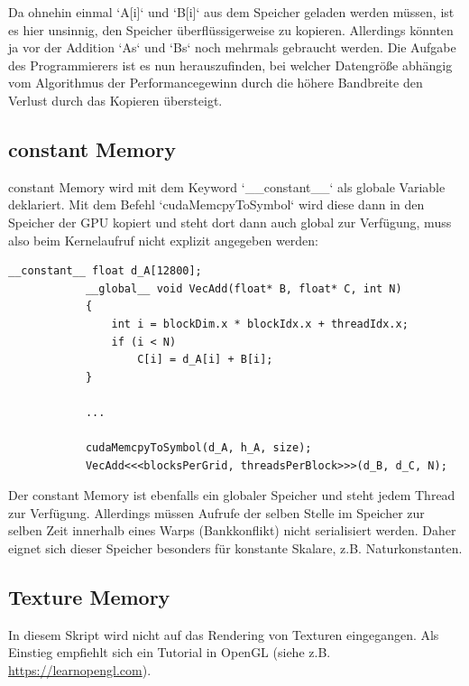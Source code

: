 		Da ohnehin einmal \li`A[i]` und \li`B[i]` aus dem Speicher geladen werden müssen, ist es hier unsinnig, den Speicher überflüssigerweise zu kopieren. Allerdings könnten ja vor der Addition \li`As` und \li`Bs` noch mehrmals gebraucht werden. Die Aufgabe des Programmierers ist es nun herauszufinden, bei welcher Datengröße abhängig vom Algorithmus der \Gls{Performance}gewinn durch die höhere Bandbreite den Verlust durch das Kopieren übersteigt.
		
		\subsection{constant Memory}
		\Gls{constant Memory} wird mit dem Keyword \li`__constant__` als globale Variable deklariert. Mit dem Befehl \li`cudaMemcpyToSymbol` wird diese dann in den Speicher der GPU kopiert und steht dort dann auch global zur Verfügung, muss also beim \Gls{Kernel}aufruf nicht explizit angegeben werden:
		\begin{lstlisting}[caption=Vektoraddition constant Memory]
			__constant__ float d_A[12800];
			__global__ void VecAdd(float* B, float* C, int N)
			{
    			int i = blockDim.x * blockIdx.x + threadIdx.x;
    			if (i < N)
        			C[i] = d_A[i] + B[i];
			}
			
			...
			
			cudaMemcpyToSymbol(d_A, h_A, size);
			VecAdd<<<blocksPerGrid, threadsPerBlock>>>(d_B, d_C, N);
		\end{lstlisting}
		
		Der \gls{constant Memory} ist ebenfalls ein globaler Speicher und steht jedem \Gls{Thread} zur Verfügung. Allerdings müssen Aufrufe der selben Stelle im Speicher zur selben Zeit innerhalb eines \Glspl{Warp} (Bankkonflikt) nicht serialisiert werden. Daher eignet sich dieser Speicher besonders für konstante Skalare, z.B. Naturkonstanten.
		
		\subsection{Texture Memory}
		In diesem Skript wird nicht auf das Rendering von Texturen eingegangen. Als Einstieg empfiehlt sich ein Tutorial in OpenGL (siehe z.B. \url{https://learnopengl.com}).
		
